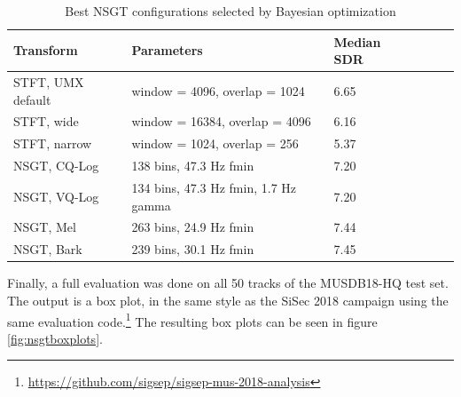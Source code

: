 \documentclass[letter,12pt,notitlepage]{article}
\begin{document}
\begin{table}[ht]
	\centering
\begin{tabular}{ |l|l|l|c|c|c| }
	 \hline
	  Transform & Parameters & Median SDR \\
	 \hline
	 \hline
	 STFT, UMX default & window = 4096, overlap = 1024 & 6.65 \\
	 \hline
	 STFT, wide & window = 16384, overlap = 4096 & 6.16 \\
	 \hline
	 STFT, narrow & window = 1024, overlap = 256 & 5.37 \\
	 \hline
	 NSGT, CQ-Log & 138 bins, 47.3 Hz fmin & 7.20 \\
	 \hline
	 NSGT, VQ-Log & 134 bins, 47.3 Hz fmin, 1.7 Hz gamma & 7.20 \\
	 \hline
	 NSGT, Mel & 263 bins, 24.9 Hz fmin & 7.44 \\
	 \hline
	 NSGT, Bark & 239 bins, 30.1 Hz fmin & 7.45 \\
	 \hline
\end{tabular}
	\caption{Best NSGT configurations selected by Bayesian optimization}
	\label{table:nsgtbayesresults}
\end{table}

Finally, a full evaluation was done on all 50 tracks of the MUSDB18-HQ test set. The output is a box plot, in the same style as the SiSec 2018 campaign using the same evaluation code.\footnote{\href{https://github.com/sigsep/sigsep-mus-2018-analysis}{https://github.com/sigsep/sigsep-mus-2018-analysis}} The resulting box plots can be seen in figure \ref{fig:nsgtboxplots}.
\end{document}

